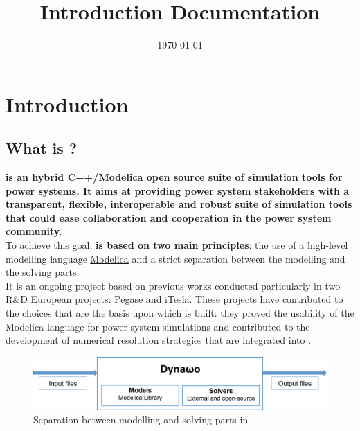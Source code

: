\documentclass[a4paper, 12pt]{report}
\begin{document}
\title{\Dynawo Introduction Documentation}
\date\today

\maketitle
\tableofcontents

\chapter{Introduction}

\section{What is \Dynawo ?}

\textbf{\Dynawo is an hybrid C++/Modelica open source suite of simulation tools for power systems. It aims at providing power system stakeholders with a transparent, flexible, interoperable and robust suite of simulation tools that could ease collaboration and cooperation in the power system community.} \\

To achieve this goal, \textbf{\Dynawo is based on two main principles}: the use of a high-level modelling language \href{https://modelica.org/} {\underline{Modelica}} and a strict separation between the modelling and the solving parts. \\

It is an ongoing project based on previous works conducted particularly in two R\&D European projects: \href{http://www.fp7-pegase.com/}{\underline{Pegase}} and \href{http://www.itesla-project.eu/}{\underline{iTesla}}. These projects have contributed to the choices that are the basis upon which \Dynawo is built: they proved the usability of the Modelica language for power system simulations and contributed to the development of numerical resolution strategies that are integrated into \Dynawo. \\

\begin{figure}[h!]
\centering
\includegraphics[width=\textwidth]{../resources/DynawoModelSolverLight.png}
\caption{Separation between modelling and solving parts in \Dynawo}
\end{figure}
\end{document}

